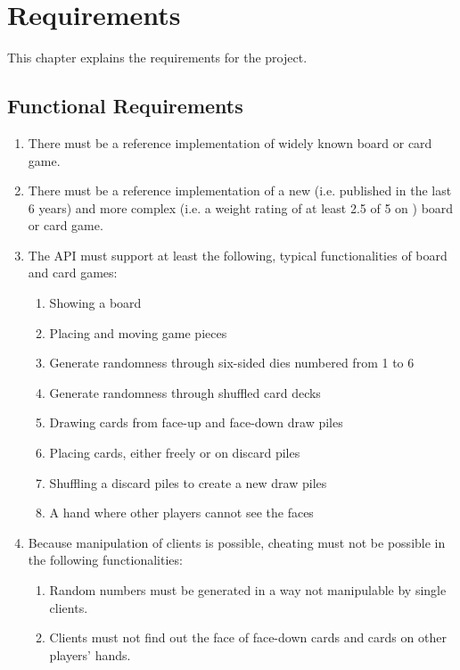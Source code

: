 \chapter{Requirements} \label{chap:requirements}

This chapter explains the requirements for the project.

\section{Functional Requirements}

\begin{enumerate}
  \item There must be a reference implementation of widely known board or card
  game.
  \item There must be a reference implementation of a new (i.e. published in
  the last 6 years) and more complex (i.e. a weight rating of at least 2.5 of 5
  on \cite{BGG}) board or card game.
  \item The API must support at least the following, typical functionalities of
  board and card games:
  \begin{enumerate}
    \item Showing a board
    \item Placing and moving game pieces
    \item Generate randomness through six-sided \glspl{die} numbered from 1 to 6
    \item Generate randomness through shuffled card \glspl{deck}
    \item Drawing cards from \gls{face}-up and \gls{face}-down
    \glspl{draw pile}
    \item Placing cards, either freely or on \glspl{discard pile}
    \item Shuffling a \glspl{discard pile} to create a new \glspl{draw pile}
    \item A \gls{hand} where other players cannot see the \glspl{face}
  \end{enumerate}
  \item Because manipulation of clients is possible, cheating must not be
  possible in the following functionalities:
  \begin{enumerate}
    \item Random numbers must be generated in a way not manipulable by single
    clients.
    \item Clients must not find out the \gls{face} of \gls{face}-down cards and
    cards on other players' \glspl{hand}.

\end{enumerate}
\end{enumerate}

